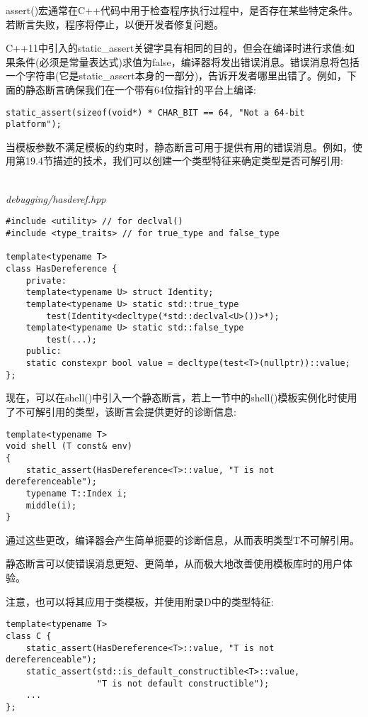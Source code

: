 assert()宏通常在C++代码中用于检查程序执行过程中，是否存在某些特定条件。若断言失败，程序将停止，以便开发者修复问题。

C++11中引入的static\_assert关键字具有相同的目的，但会在编译时进行求值:如果条件(必须是常量表达式)求值为false，编译器将发出错误消息。错误消息将包括一个字符串(它是static\_assert本身的一部分)，告诉开发者哪里出错了。例如，下面的静态断言确保我们在一个带有64位指针的平台上编译:

\begin{lstlisting}[style=styleCXX]
static_assert(sizeof(void*) * CHAR_BIT == 64, "Not a 64-bit platform");
\end{lstlisting}

当模板参数不满足模板的约束时，静态断言可用于提供有用的错误消息。例如，使用第19.4节描述的技术，我们可以创建一个类型特征来确定类型是否可解引用:

\hspace*{\fill} \\ %
\noindent
\textit{debugging/hasderef.hpp}
\begin{lstlisting}[style=styleCXX]
#include <utility> // for declval()
#include <type_traits> // for true_type and false_type

template<typename T>
class HasDereference {
	private:
	template<typename U> struct Identity;
	template<typename U> static std::true_type
		test(Identity<decltype(*std::declval<U>())>*);
	template<typename U> static std::false_type
		test(...);
	public:
	static constexpr bool value = decltype(test<T>(nullptr))::value;
};
\end{lstlisting}

现在，可以在shell()中引入一个静态断言，若上一节中的shell()模板实例化时使用了不可解引用的类型，该断言会提供更好的诊断信息:

\begin{lstlisting}[style=styleCXX]
template<typename T>
void shell (T const& env)
{
	static_assert(HasDereference<T>::value, "T is not dereferenceable");
	typename T::Index i;
	middle(i);
}
\end{lstlisting}

通过这些更改，编译器会产生简单扼要的诊断信息，从而表明类型T不可解引用。

静态断言可以使错误消息更短、更简单，从而极大地改善使用模板库时的用户体验。

注意，也可以将其应用于类模板，并使用附录D中的类型特征:

\begin{lstlisting}[style=styleCXX]
template<typename T>
class C {
	static_assert(HasDereference<T>::value, "T is not dereferenceable");
	static_assert(std::is_default_constructible<T>::value,
				  "T is not default constructible");
	...
};
\end{lstlisting}




































